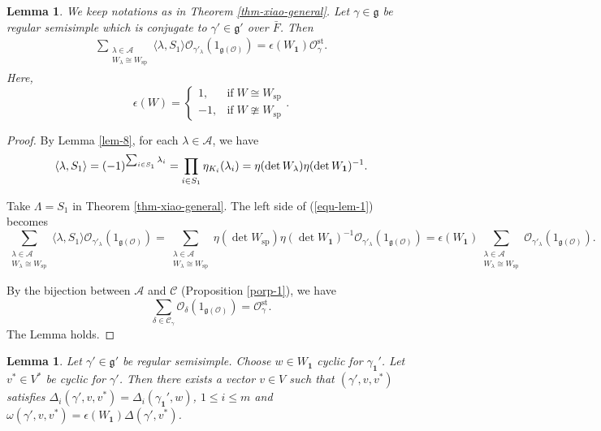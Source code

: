 \documentclass[a4paper]{amsart}
\newcommand{\CA}{{\mathcal {A}}} \newcommand{\CB}{{\mathcal {B}}}
\newcommand{\CC}{{\mathcal {C}}} \renewcommand{\CD}{{\mathcal {D}}}
\newcommand{\CO}{{\mathcal {O}}} \newcommand{\CP}{{\mathcal {P}}}
\newcommand{\fg}{{\mathfrak{g}}} \newcommand{\fh}{{\mathfrak{h}}}
\newcommand{\st}{{\mathrm{st}}}\newcommand{\supp}{{\mathrm{supp}}}
\theoremstyle{plain}
\newtheorem{lem}[thm]{Lemma}  \newtheorem{prop}[thm]{Proposition}
\theoremstyle{remark} \newtheorem{remark}[thm]{Remark}
\theoremstyle{exercise} \newtheorem{exercise}[thm]{Exercise}
\theoremstyle{example} \newtheorem{example}[thm]{Example}
\theoremstyle{question} \newtheorem{question}[thm]{Question}
\theoremstyle{assumption} \newtheorem{assumption}[thm]{Assumption}
\numberwithin{equation}{section}
\renewcommand{\sp}{{\mathrm{sp}}}
\begin{document}
\begin{lem}\label{lem-1} 
We keep notations as in Theorem \ref{thm-xiao-general}. 
Let $\gamma \in \fg$ be regular semisimple which is conjugate
to $\gamma' \in \fg'$ over $\bar{F}$. Then 
\begin{align}\label{equ-lem-1}
    \sum_{\substack{\lambda\in\mathcal A\\W_\lambda\cong W_\sp}}\langle\lambda,S_1\rangle \CO_{\gamma'_{\lambda}}( 1_{\fg(\CO)})=\epsilon(W_{\mathbf 1})\CO_{\gamma}^{\st}.
\end{align}
Here, 
\[\epsilon(W)=\begin{cases}1,&\text{if} \;W\cong W_\sp \\-1,&\text{if} \;W\ncong W_\sp \end{cases}.\]
\end{lem}
\begin{proof}

By Lemma \ref{lem-8}, for each $\lambda \in \CA$, we have
\[\langle\lambda,S_1\rangle=(-1)^{\sum_{i\in S_1}\lambda_i}=\prod_{i\in S_1}\eta_{K_i}(\lambda_i) = \eta(\det W_\lambda)\eta(\det W_{\bf 1})^{-1}.\]

Take $\Lambda = S_1$ in Theorem \ref{thm-xiao-general}. 
The left side of (\ref{equ-lem-1}) becomes
\[\sum_{\substack{\lambda\in\CA\\W_\lambda\cong W_\sp}}
\langle\lambda,S_1\rangle \CO_{\gamma'_{\lambda}}( 1_{\fg(\CO)})=\sum_{\substack{\lambda\in\mathcal A\\W_\lambda\cong W_\sp}}
\eta(\det W_\sp)\eta(\det W_{\mathbf 1})^{-1}\CO_{\gamma'_{\lambda}}(1_{\fg(\CO)})=\epsilon(W_{\mathbf 1})\sum_{\substack{\lambda\in\mathcal A\\W_\lambda\cong W_\sp}}
\CO_{\gamma'_{\lambda}}( 1_{\fg(\CO)}).\]

By the bijection between $\CA$ and $\CC$ (Proposition \ref{porp-1}),
we have
\[
\sum_{\delta \in \CC_\gamma} \CO_\delta(1_{\fg(\CO)})
 = \CO_\gamma^\st.\]
 The Lemma holds.
\end{proof}
\begin{lem}\label{lem-2}
Let $\gamma'\in\fg'$ be regular semisimple. Choose $w\in W_{\mathbf 1}$ cyclic for $\gamma_{\mathbf 1}'$. Let $v^*\in V^*$ be cyclic for $\gamma'$. Then there exists a vector $v\in V$ such that $(\gamma',v,v^*)$ satisfies  $\Delta_i(\gamma',v,v^*)=\Delta
_i(\gamma_{\mathbf 1}',w)$, $1\leq i\leq m$ and $\omega(\gamma',v,v^*)=\epsilon(W_\mathbf{1})\Delta(\gamma',v^*)$.
\end{lem}
\end{document}
